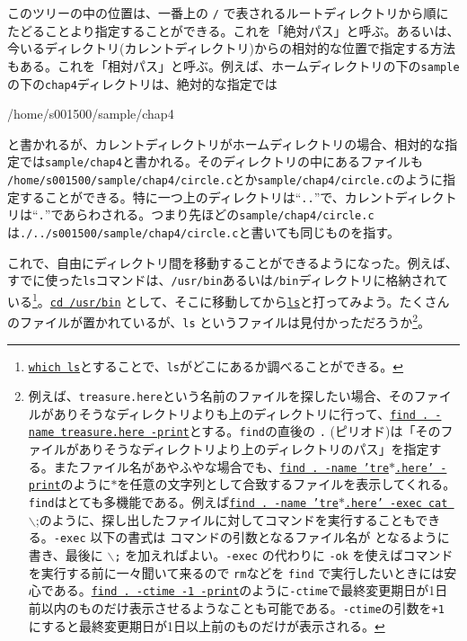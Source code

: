 \noindent このツリーの中の位置は、一番上の \texttt{/} で表されるルートディレクトリから順にたどることより指定することができる。これを「絶対パス」と呼ぶ。あるいは、今いるディレクトリ(カレントディレクトリ)からの相対的な位置で指定する方法もある。これを「相対パス」と呼ぶ。例えば、ホームディレクトリの下の\texttt{sample}の下の\texttt{chap4}ディレクトリは、絶対的な指定では
\begin{tt}
    /home/s001500/sample/chap4
\end{tt}
と書かれるが、カレントディレクトリがホームディレクトリの場合、相対的な指定では\texttt{sample/chap4}と書かれる。そのディレクトリの中にあるファイルも \texttt{/home/s001500/sample/chap4/circle.c}とか\texttt{sample/chap4/circle.c}のように指定することができる。特に一つ上のディレクトリは``\texttt{..}''で、カレントディレクトリは``\texttt{.}''であらわされる。つまり先ほどの\texttt{sample/chap4/circle.c}は\texttt{./../s001500/sample/chap4/circle.c}と書いても同じものを指す。

これで、自由にディレクトリ間を移動することができるようになった。例えば、すでに使った\texttt{ls}コマンドは、\texttt{/usr/bin}あるいは\texttt{/bin}ディレクトリに格納されている\footnote{\underline{\texttt{which ls}}とすることで、\texttt{ls}がどこにあるか調べることができる。}。\underline{\texttt{cd /usr/bin}} として、そこに移動してから\underline{\texttt{ls}}と打ってみよう。たくさんのファイルが置かれているが、\texttt{ls} というファイルは見付かっただろうか\footnote{例えば、\texttt{treasure.here}という名前のファイルを探したい場合、そのファイルがありそうなディレクトリよりも上のディレクトリに行って、\underline{\texttt{find . -name treasure.here -print}}とする。\texttt{find}の直後の \texttt{.} (ピリオド)は「そのファイルがありそうなディレクトリより上のディレクトリのパス」を指定する。またファイル名があやふやな場合でも、\underline{\texttt{find . -name 'tre\(\ast\).here' -print}}のように\(\ast\)を任意の文字列として合致するファイルを表示してくれる。\texttt{find}はとても多機能である。例えば\underline{\texttt{find . -name 'tre\(\ast\).here' -exec cat \textbraceleft \textbraceright} \(\backslash\);}のように、探し出したファイルに対してコマンドを実行することもできる。\texttt{-exec} 以下の書式は コマンドの引数となるファイル名が \textbraceleft \textbraceright となるように書き、最後に \texttt{\(\backslash\);} を加えればよい。\texttt{-exec} の代わりに \texttt{-ok} を使えばコマンドを実行する前に一々聞いて来るので \texttt{rm}などを \texttt{find} で実行したいときには安心である。\underline{\texttt{find\ .\ -ctime -1 -print}}のように\texttt{-ctime}で最終変更期日が1日前以内のものだけ表示させるようなことも可能である。\texttt{-ctime}の引数を\texttt{+1} にすると最終変更期日が1日以上前のものだけが表示される。}。

